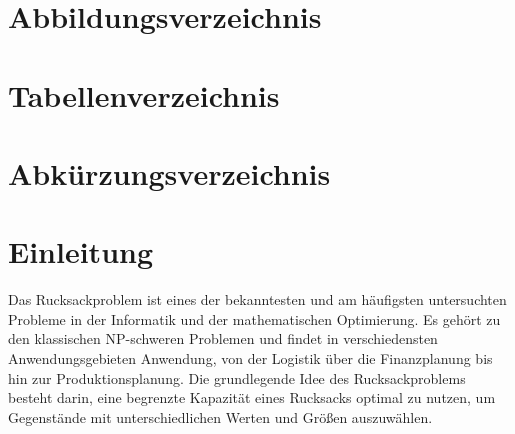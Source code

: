 \documentclass[12pt]{report}
\begin{document}

\tableofcontents
{}
\thispagestyle{plain}
\newpage
\chapter*{Abbildungsverzeichnis}

\listoffigures




\newpage
\chapter*{Tabellenverzeichnis}

\listoftables


\newpage
\chapter*{Abkürzungsverzeichnis}

\begin{acronym}[SOAP]
\end{acronym}


\addtocounter{frontmatterPage}{\value{page}} 

\newpage
{}
\chapter{Einleitung}
Das Rucksackproblem ist eines der bekanntesten und am häufigsten untersuchten Probleme in der Informatik und der mathematischen Optimierung. Es gehört zu den klassischen NP-schweren Problemen und findet in verschiedensten Anwendungsgebieten Anwendung, von der Logistik über die Finanzplanung bis hin zur Produktionsplanung. Die grundlegende Idee des Rucksackproblems besteht darin, eine begrenzte Kapazität eines Rucksacks optimal zu nutzen, um Gegenstände mit unterschiedlichen Werten und Größen auszuwählen. 
\end{document}
